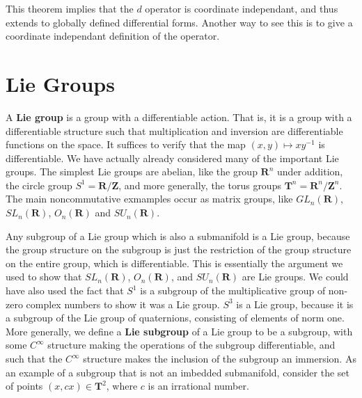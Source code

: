 This theorem implies that the $d$ operator is coordinate independant, and thus extends to globally defined differential forms. Another way to see this is to give a coordinate independant definition of the operator.






\chapter{Lie Groups}

A {\bf Lie group} is a group with a differentiable action. That is, it is a group with a differentiable structure such that multiplication and inversion are differentiable functions on the space. It suffices to verify that the map $(x,y) \mapsto xy^{-1}$ is differentiable. We have actually already considered many of the important Lie groups. The simplest Lie groups are abelian, like the group $\mathbf{R}^n$ under addition, the circle group $S^1 = \mathbf{R}/\mathbf{Z}$, and more generally, the torus groups $\mathbf{T}^n = \mathbf{R}^n/\mathbf{Z}^n$. The main noncommutative exmamples occur as matrix groups, like $GL_n(\mathbf{R})$, $SL_n(\mathbf{R})$, $O_n(\mathbf{R})$ and $SU_n(\mathbf{R})$.

Any subgroup of a Lie group which is also a submanifold is a Lie group, because the group structure on the subgroup is just the restriction of the group structure on the entire group, which is differentiable. This is essentially the argument we used to show that $SL_n(\mathbf{R})$, $O_n(\mathbf{R})$, and $SU_n(\mathbf{R})$ are Lie groups. We could have also used the fact that $S^1$ is a subgroup of the multiplicative group of non-zero complex numbers to show it was a Lie group. $S^3$ is a Lie group, because it is a subgroup of the Lie group of quaternions, consisting of elements of norm one. More generally, we define a {\bf Lie subgroup} of a Lie group to be a subgroup, with some $C^\infty$ structure making the operations of the subgroup differentiable, and such that the $C^\infty$ structure makes the inclusion of the subgroup an immersion. As an example of a subgroup that is not an imbedded submanifold, consider the set of points $(x,cx) \in \mathbf{T}^2$, where $c$ is an irrational number.

